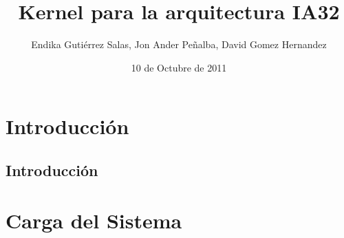 \documentclass[]{report}
\begin{document}
\title{Kernel para la arquitectura IA32}
\author{Endika Guti\'errez Salas, Jon Ander Pe\~nalba, David Gomez Hernandez}
\date{10 de Octubre de 2011}
\maketitle

\chapter{Introducci\'on}
\section{Introducci\'on}


\chapter{Carga del Sistema}
\section{}
\end{document}
